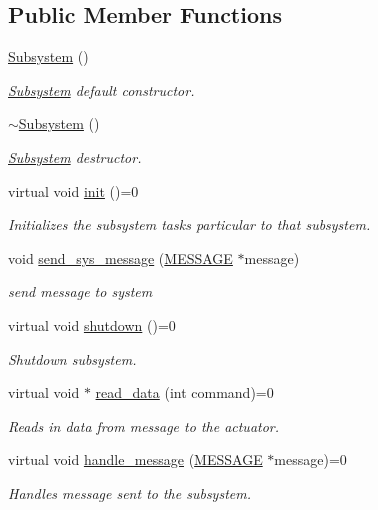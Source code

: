 \subsection*{Public Member Functions}
\begin{DoxyCompactItemize}
\item 
\hyperlink{classSubsystem_abdec44abe9ddba76f65abb02f8f62992}{Subsystem} ()
\begin{DoxyCompactList}\small\item\em \hyperlink{classSubsystem}{Subsystem} default constructor. \end{DoxyCompactList}\item 
\hyperlink{classSubsystem_af6026d0c678986cf1626251bf38916fa}{$\sim$\-Subsystem} ()
\begin{DoxyCompactList}\small\item\em \hyperlink{classSubsystem}{Subsystem} destructor. \end{DoxyCompactList}\item 
virtual void \hyperlink{classSubsystem_a77a984e8a06bfebb924a6e7ba4f98363}{init} ()=0
\begin{DoxyCompactList}\small\item\em Initializes the subsystem tasks particular to that subsystem. \end{DoxyCompactList}\item 
void \hyperlink{classSubsystem_a2c33b82253ec4588067349e33247f504}{send\-\_\-sys\-\_\-message} (\hyperlink{SUBSYS__COMMANDS_8h_ad814416fc1a8c675bea2687d96088a8f}{M\-E\-S\-S\-A\-G\-E} $\ast$message)
\begin{DoxyCompactList}\small\item\em send message to system \end{DoxyCompactList}\item 
virtual void \hyperlink{classSubsystem_a510e18f972a3d86d7a47432dafa1ce4c}{shutdown} ()=0
\begin{DoxyCompactList}\small\item\em Shutdown subsystem. \end{DoxyCompactList}\item 
virtual void $\ast$ \hyperlink{classSubsystem_a85307df3e46421814204f77929e893aa}{read\-\_\-data} (int command)=0
\begin{DoxyCompactList}\small\item\em Reads in data from message to the actuator. \end{DoxyCompactList}\item 
virtual void \hyperlink{classSubsystem_a6205bccfd4906044065d25d8ab1a7bfb}{handle\-\_\-message} (\hyperlink{SUBSYS__COMMANDS_8h_ad814416fc1a8c675bea2687d96088a8f}{M\-E\-S\-S\-A\-G\-E} $\ast$message)=0
\begin{DoxyCompactList}\small\item\em Handles message sent to the subsystem. \end{DoxyCompactList}\end{DoxyCompactItemize}

